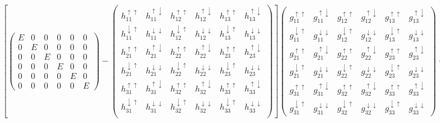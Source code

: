 \documentclass[10pt,prb,showpacs,amssymb,floatfix]{revtex4-1}
\newcommand{\dna}{\downarrow}
\newcommand{\upa}{\uparrow}
\begin{document}
\begin{align}
\left[ \left(\begin{array}{cccccc} 
 E   &  0 & 0 &  0 & 0 &  0  \\
0 &  E & 0 & 0 &  0 & 0 \\
 0 & 0 & E & 0 &  0 & 0 \\
 0 & 0 & 0 & E &  0 & 0 \\
  0 & 0 & 0 & 0 &  E & 0 \\
   0 & 0 & 0 & 0 &  0 & E
\end{array}\right) -
 \left(\begin{array}{cccccc} 
h_{11}^{\upa\upa}   &  h_{11}^{\upa\dna} & h_{12}^{\upa\upa} & h_{12}^{\upa\dna} &   h_{13}^{\upa\upa} & h_{13}^{\upa\dna}\\
h_{11}^{\dna\upa}   &  h_{11}^{\dna\dna} & h_{12}^{\dna\upa} & h_{12}^{\dna\dna} &   h_{13}^{\dna\upa} & h_{13}^{\dna\dna}\\
h_{21}^{\upa\upa}   &  h_{21}^{\upa\dna} & h_{22}^{\upa\upa} & h_{22}^{\upa\dna} &   h_{23}^{\upa\upa} & h_{23}^{\upa\dna} \\
h_{21}^{\dna\upa}   &  h_{21}^{\dna\dna} & h_{22}^{\dna\upa} & h_{22}^{\dna\dna} &   h_{23}^{\dna\upa} & h_{23}^{\dna\dna} \\
h_{31}^{\upa\upa}   &  h_{31}^{\upa\dna} & h_{32}^{\upa\upa} & h_{32}^{\upa\dna} &   h_{33}^{\upa\upa} & h_{33}^{\upa\dna} \\
h_{31}^{\dna\upa}   &  h_{31}^{\dna\dna} & h_{32}^{\dna\upa} & h_{32}^{\dna\dna} &   h_{33}^{\dna\upa} & h_{33}^{\dna\dna} \\
\end{array}\right) \right]
 \left(\begin{array}{cccccc} 
g_{11}^{\upa\upa}   &  g_{11}^{\upa\dna} & g_{12}^{\upa\upa}   &  g_{12}^{\upa\dna} & g_{13}^{\upa\upa}   &  g_{13}^{\upa\dna} \\
g_{11}^{\dna\upa} &  g_{11}^{\dna\dna}& g_{12}^{\dna\upa}   &  g_{12}^{\dna\dna} & g_{13}^{\dna\upa}   &  g_{13}^{\dna\dna} \\
g_{21}^{\upa\upa}   &  g_{21}^{\upa\dna} & g_{22}^{\upa\upa}   &  g_{22}^{\upa\dna} & g_{23}^{\upa\upa}   &  g_{23}^{\upa\dna} \\
g_{21}^{\dna\upa} &  g_{21}^{\dna\dna}& g_{22}^{\dna\upa}   &  g_{22}^{\dna\dna} & g_{23}^{\dna\upa}   &  g_{23}^{\dna\dna} \\
g_{31}^{\upa\upa}   &  g_{31}^{\upa\dna} & g_{32}^{\upa\upa}   &  g_{32}^{\upa\dna} & g_{33}^{\upa\upa}   &  g_{33}^{\upa\dna} \\
g_{31}^{\dna\upa} &  g_{31}^{\dna\dna}& g_{32}^{\dna\upa}   &  g_{32}^{\dna\dna} & g_{33}^{\dna\upa}   &  g_{33}^{\dna\dna} 
\end{array}\right)  =  
 \left(\begin{array}{cccccc} 
 1   &  0 & 0 &  0 & 0 &  0  \\
0 &  1 & 0 & 0 &  0 & 0 \\
 0 & 0 & 1 & 0 &  0 & 0 \\
 0 & 0 & 0 & 1 &  0 & 0 \\
  0 & 0 & 0 & 0 &  1 & 0 \\
   0 & 0 & 0 & 0 &  0 & 1,
\end{array}\right). 
\label{mat001}
\end{align}
\end{document}
